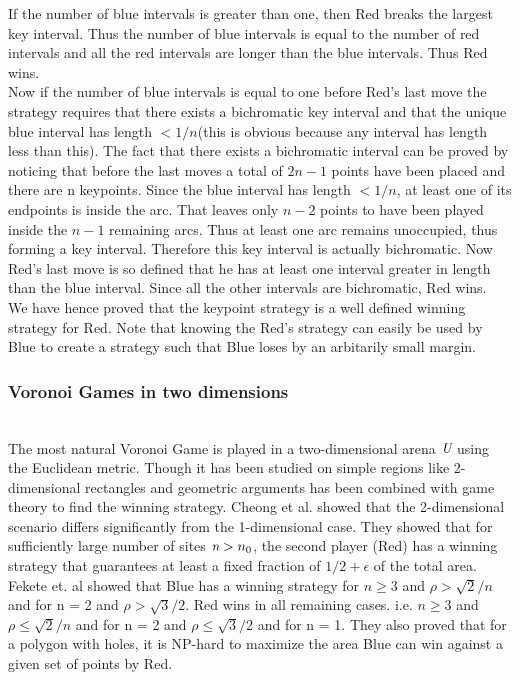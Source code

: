 \documentclass[12pt]{article}
\begin{document}
If the number of blue intervals is greater than one, then Red breaks the largest key interval. Thus the number of blue intervals is equal to the number of red intervals and all the red intervals are longer than the blue intervals. Thus Red wins.
\\

Now if the number of blue intervals is equal to one before Red's last move the strategy requires that there exists a bichromatic key interval and that the unique blue interval has length $< 1/n$(this is obvious because any interval has length less than this). The fact that there exists a bichromatic interval can be proved by noticing that before the last moves a total of $2n-1$ points have been placed and there are n keypoints. Since the blue interval has length $<1/n$, at least one of its endpoints is inside the arc. That leaves only $n-2$ points to have been played inside the $n-1$ remaining arcs. Thus at least one arc remains unoccupied, thus forming a key interval. Therefore this key interval is actually bichromatic. Now Red's last move is so defined that he has at least one interval greater in length than the blue interval. Since all the other intervals are bichromatic, Red wins.
\\

We have hence proved that the keypoint strategy is a well defined winning strategy for Red. Note that knowing the Red's strategy can easily be used by Blue to create a strategy such that Blue loses by an arbitarily small margin. 
\\

\subsubsection{Voronoi Games in two dimensions}\\

\indent \indent The most natural Voronoi Game is played in a two-dimensional arena $\emph{U}$ using the Euclidean metric. Though it has been studied on simple regions like 2-dimensional rectangles and geometric arguments has been combined with game theory to find the winning strategy. Cheong et al. showed that the 2-dimensional scenario differs significantly from the 1-dimensional case. They showed that for sufficiently large number of sites $\emph{n} > n_0 $, the second player (Red) has a winning strategy that guarantees at least a fixed fraction of $1/2 + \epsilon $ of the total area.
Fekete et. al showed  that Blue has a winning strategy for $n \geq 3$ and $\rho > \sqrt{2}/n$ and for n = 2 and $\rho > \sqrt{3}/2$.
Red wins in all remaining cases. i.e. $n \geq 3$ and $\rho \leq \sqrt{2}/n$ and for n = 2 and $\rho \leq \sqrt{3}/2$ and for n = 1.
They also proved that for a polygon with holes, it is NP-hard to maximize the area Blue can win against a given set of points by Red.\\
\end{document}
